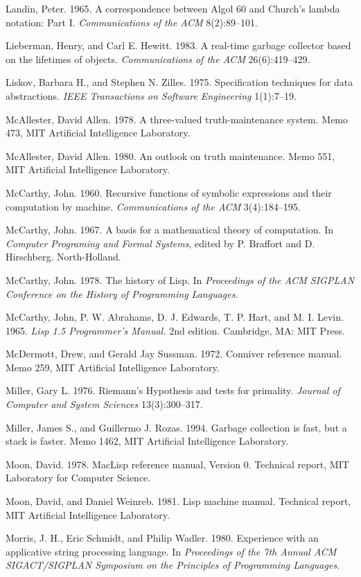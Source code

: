 {Landin, Peter.  1965.  A correspondence between Algol 60 and Church's
lambda notation: Part I.  {\em Communications of the ACM}
8(2):89--101.

Lieberman, Henry, and Carl E. Hewitt. 1983. A real-time garbage
collector based on the lifetimes of objects. {\em Communications of
the ACM} 26(6):419--429.

Liskov, Barbara H., and Stephen N. Zilles.  1975.  Specification
techniques for data abstractions.  {\em IEEE Transactions on Software
Engineering} 1(1):7--19.

McAllester, David Allen.  1978.  A three-valued truth-maintenance
system.  Memo 473, MIT Artificial Intelligence Laboratory.

McAllester, David Allen.  1980.  An outlook on truth maintenance.
Memo 551, MIT Artificial Intelligence Laboratory.

McCarthy, John.  1960.  Recursive functions of symbolic expressions
and their computation by machine.  {\em Communications of the ACM}
3(4):184--195.

McCarthy, John.  1967.  A basis for a mathematical theory of
computation.  In {\em Computer Programing and Formal Systems}, edited
by P. Braffort and D. Hirsch\-berg.  North-Holland.

McCarthy, John.  1978.  The history of Lisp.  In {\em Proceedings of
the ACM SIGPLAN Conference on the History of Programming Languages.}

McCarthy, John, P. W. Abrahams, D. J. Edwards, T. P. Hart, and M. I.
Levin.  1965.  {\em Lisp 1.5 Programmer's Manual.}  2nd edition.
Cambridge, MA: MIT Press.

McDermott, Drew, and Gerald Jay Sussman.  1972. Conniver reference
manual.  Memo 259, MIT Artificial Intelligence Laboratory.

Miller, Gary L.  1976.  Riemann's Hypothesis and tests for primality.
{\em Journal of Computer and System Sciences} 13(3):300--317.

Miller, James S., and Guillermo J. Rozas. 1994.  Garbage collection is
fast, but a stack is faster.  Memo 1462, MIT Artificial Intelligence
Laboratory.

Moon, David.  1978.  MacLisp reference manual, Version 0.  Technical
report, MIT Laboratory for Computer Science.

Moon, David, and Daniel Weinreb.  1981.  Lisp machine manual.
Technical report, MIT Artificial Intelligence Laboratory.

Morris, J. H., Eric Schmidt, and Philip Wadler.  1980.  Experience
with an ap\-pli\-ca\-tive string processing language.  In {\em Proceedings
of the 7th Annual ACM SIGACT/SIGPLAN Symposium on the Principles of
Programming Languages.}

}
